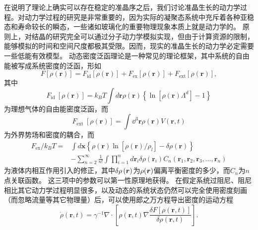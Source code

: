 \documentclass[hyperref, UTF8, a4paper]{ctexart}
\begin{document}
在说明了理论上确实可以存在稳定的准晶序之后，我们讨论准晶生长的动力学过程。对动力学过程的研究是非常重要的，因为实际的凝聚态系统中充斥着各种亚稳态和寿命较长的瞬态\cite{PhysRevB.75.064107}，一些诸如玻璃化的重要物理现象本质上就是动力学的\cite{mct-primer}。
原则上，对结晶的研究完全可以通过分子动力学模拟实现，但由于计算资源的限制，能够模拟的时间和空间尺度都极其受限\cite{PhysRevLett.88.245701}。因而，现实的准晶生长的动力学必定需要一些低能有效模型。
动态密度泛函理论是一种常见的理论框架\cite{pfc2009,PhysRevB.75.064107}，其中系统的自由能被写成系统密度的泛函，形如
\begin{equation}
    F[\rho(\boldsymbol{r})]=F_{\mathrm{id}}[\rho(\boldsymbol{r})]+F_{\mathrm{ex}}[\rho(\boldsymbol{r})]+F_{\mathrm{ext}}[\rho(\boldsymbol{r})],
\end{equation}
其中
\begin{equation}
    F_{\text {id }}[\rho(\boldsymbol{r})]=k_{B} T \int d \boldsymbol{r} \rho(\boldsymbol{r})\left\{\ln \left[\rho(\boldsymbol{r}) \Lambda^{d}\right]-1\right\}
\end{equation}
为理想气体的自由能密度泛函，而
\begin{equation}
    F_{\text {ext }}[\rho(\boldsymbol{r})]=\int \dd^3 \boldsymbol{r} \rho(\boldsymbol{r}) V(\boldsymbol{r}, t)
\end{equation}
为外界势场和密度的耦合，而
\begin{equation}
    \begin{aligned}
        {F}_\text{ex} / k_{B} T=& \int d \boldsymbol{x}\left\{\rho(\boldsymbol{r}) \ln \left[\rho(\boldsymbol{r}) / \rho_{l}\right]-\delta \rho(\boldsymbol{r})\right\} \\
        &-\sum_{n=2}^{\infty} \frac{1}{n !} \int \prod_{i=1}^{n} d \boldsymbol{r}_{i} \delta \rho\left(\boldsymbol{r}_{i}\right) C_{n}\left(\boldsymbol{r}_{1}, \boldsymbol{r}_{2}, \boldsymbol{r}_{3}, \ldots, \boldsymbol{r}_{n}\right)
        \end{aligned}
\end{equation}
为液体内相互作用引入的修正，其中$\var{\rho}(\vb*{r})$为$\rho(\vb*{r})$偏离平衡密度的多少，而$C_n$为$n$点关联函数。
这三项中的参数可以第一性原理地获得。
在假定系统过阻尼、阻尼相比其它动力学过程明显很多，以及动态的系统状态仍然可以完全使用密度刻画（而忽略流量等其它物理量）后，可以使用郎之万方程导出密度的运动方程\cite{pfc2009,PhysRevB.75.064107}
\begin{equation}
    \dot{\rho}(\mathbf{r}, t)=\gamma^{-1} \nabla \cdot\left[\rho(\mathbf{r}, t) \nabla \frac{\delta F[\rho(\mathbf{r}, t)]}{\delta \rho(\mathbf{r}, t)}\right].
    \label{eq:ddft}
\end{equation}
\end{document}
